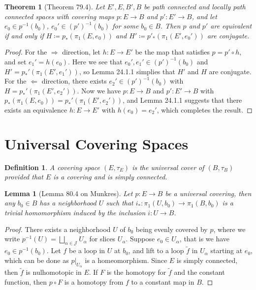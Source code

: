\documentclass[11pt]{book}
\theoremstyle{break}
\theoremstyle{break}
\newtheorem{thm}{Theorem}[section]
\newtheorem{lem}{Lemma}[thm]
\newtheorem{defn}{Definition}[corL]
\newcommand{\that}[1]{\widetilde{#1}}
\begin{document}
\begin{thm}[Theorem 79.4]
Let $E',E,B',B$ be path connected and locally path connected spaces with covering maps $p:E \to B$ and $p':E' \to B$, and let $e_0 \in p^{-1}(b_0)$, $e_0'\in (p')^{-1}(b_0)$ for some $b_0 \in B$. Then $p$ and $p'$ are equivalent if and only if $H\coloneqq p_*(\pi_1(E,e_0))$ and $H' \coloneqq p'_*(\pi_1(E',e_0'))$ are conjugate. 
\end{thm}
\begin{proof}
For the $\Rightarrow$ direction, let $h:E \to E'$ be the map that satisfies $p = p'\circ h$, and set $e_1' = h(e_0)$. Here we see that $e_0',e_1' \in (p')^{-1}(b_0)$ and $H' = p_*'(\pi_1(E',e_1'))$, so Lemma 24.1.1 simplies that $H'$ and $H$ are conjugate. For the $\Leftarrow$ direction, there exists $e_2' \in (p')^{-1}(b_0)$ with $H = p_*'(\pi_1(E',e_2'))$. Now we have $p:E \to B$ and $p':E' \to B$ with $p_*(\pi_1(E,e_0)) = p_*'(\pi_1(E',e_2'))$, and Lemma 24.1.1 suggests that there exists an equivalence $h:E \to E'$ with $h(e_0) = e_2'$, which completes the result. 
\end{proof}

\newpage
\section[Universal Covering Spaces]{\color{red}Universal Covering Spaces\color{black}}
\begin{defn}
A covering space $(E,\tau_E)$ is the universal cover of $(B,\tau_B)$ provided that $E$ is a covering and is simply connected. 
\end{defn}

\begin{lem}[Lemma 80.4 on Munkres]
Let $p:E \to B$ be a universal covering, then any $b_0 \in B$ has a neighborhood $U$ such that $i_*:\pi_1(U,b_0) \to \pi_1(B,b_0)$ is a trivial homomorphism induced by the inclusion $i:U \to B$. 
\end{lem}
\begin{proof}
There exists a neighborhood $U$ of $b_0$ being evenly covered by $p$, where we write $p^{-1}(U) = \bigsqcup_{\alpha \in \mathcal{J}}U_\alpha$ for slices $U_\alpha$. Suppose $e_0 \in U_\alpha$, that is we have $e_0 \in p^{-1}(b_0)$. Let $f$ be a loop in $U$ at $b_0$, and lift to a loop $\that{f}$ in $U_\alpha$ starting at $e_0$, which can be done as $p|_{U_{\alpha}}$ is a homeomorphism. Since $E$ is simply connected, then $\that{f}$ is nulhomotopic in $E$. If $F$ is the homotopy for $\that{f}$ and the constant function, then $p\circ F$ is a homotopy from $f$ to a constant map in $B$. 
\end{proof}
\end{document}
